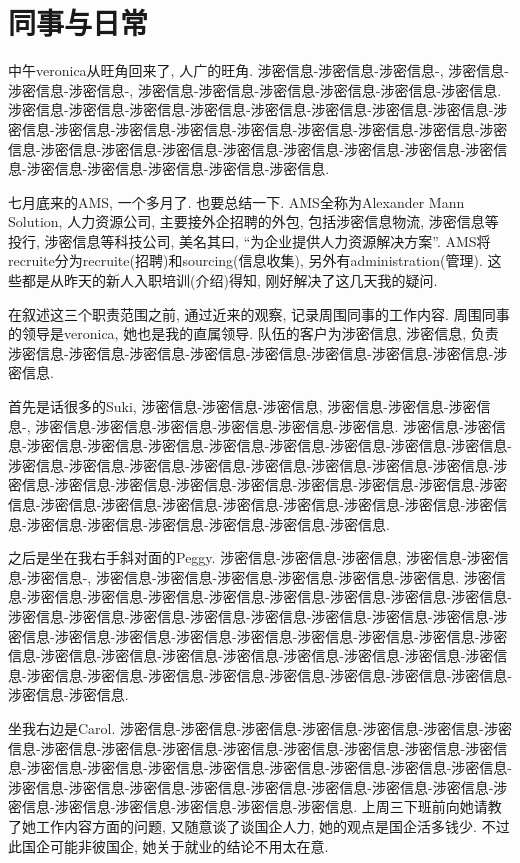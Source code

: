 \section{同事与日常}

中午veronica从旺角回来了, 人广的旺角. 涉密信息-涉密信息-涉密信息-, 涉密信息-涉密信息-涉密信息-, 涉密信息-涉密信息-涉密信息-涉密信息-涉密信息-涉密信息. 涉密信息-涉密信息-涉密信息-涉密信息-涉密信息-涉密信息-涉密信息-涉密信息-涉密信息-涉密信息-涉密信息-涉密信息-涉密信息-涉密信息-涉密信息-涉密信息-涉密信息-涉密信息-涉密信息-涉密信息-涉密信息-涉密信息-涉密信息-涉密信息-涉密信息-涉密信息-涉密信息-涉密信息-涉密信息-涉密信息.

七月底来的AMS, 一个多月了. 也要总结一下. 
AMS全称为Alexander Mann Solution, 人力资源公司, 主要接外企招聘的外包, 包括涉密信息物流, 涉密信息等投行, 涉密信息等科技公司, 美名其曰, “为企业提供人力资源解决方案”. AMS将recruite分为recruite(招聘)和sourcing(信息收集), 另外有administration(管理). 这些都是从昨天的新人入职培训(介绍)得知, 刚好解决了这几天我的疑问.

在叙述这三个职责范围之前, 通过近来的观察, 记录周围同事的工作内容. 周围同事的领导是veronica, 她也是我的直属领导. 队伍的客户为涉密信息, 涉密信息, 负责涉密信息-涉密信息-涉密信息-涉密信息-涉密信息-涉密信息-涉密信息-涉密信息-涉密信息. 

首先是话很多的Suki, 涉密信息-涉密信息-涉密信息, 涉密信息-涉密信息-涉密信息-, 涉密信息-涉密信息-涉密信息-涉密信息-涉密信息-涉密信息. 涉密信息-涉密信息-涉密信息-涉密信息-涉密信息-涉密信息-涉密信息-涉密信息-涉密信息-涉密信息-涉密信息-涉密信息-涉密信息-涉密信息-涉密信息-涉密信息-涉密信息-涉密信息-涉密信息-涉密信息-涉密信息-涉密信息-涉密信息-涉密信息-涉密信息-涉密信息-涉密信息-涉密信息-涉密信息-涉密信息-涉密信息-涉密信息-涉密信息-涉密信息-涉密信息-涉密信息-涉密信息-涉密信息-涉密信息-涉密信息-涉密信息.

之后是坐在我右手斜对面的Peggy. 涉密信息-涉密信息-涉密信息, 涉密信息-涉密信息-涉密信息-, 涉密信息-涉密信息-涉密信息-涉密信息-涉密信息-涉密信息. 涉密信息-涉密信息-涉密信息-涉密信息-涉密信息-涉密信息-涉密信息-涉密信息-涉密信息-涉密信息-涉密信息-涉密信息-涉密信息-涉密信息-涉密信息-涉密信息-涉密信息-涉密信息-涉密信息-涉密信息-涉密信息-涉密信息-涉密信息-涉密信息-涉密信息-涉密信息-涉密信息-涉密信息-涉密信息-涉密信息-涉密信息-涉密信息-涉密信息-涉密信息-涉密信息-涉密信息-涉密信息-涉密信息-涉密信息-涉密信息-涉密信息-涉密信息-涉密信息-涉密信息.

坐我右边是Carol. 涉密信息-涉密信息-涉密信息-涉密信息-涉密信息-涉密信息-涉密信息-涉密信息-涉密信息-涉密信息-涉密信息-涉密信息-涉密信息-涉密信息-涉密信息-涉密信息-涉密信息-涉密信息-涉密信息-涉密信息-涉密信息-涉密信息-涉密信息-涉密信息-涉密信息-涉密信息-涉密信息-涉密信息-涉密信息-涉密信息-涉密信息-涉密信息-涉密信息-涉密信息-涉密信息-涉密信息-涉密信息. 上周三下班前向她请教了她工作内容方面的问题, 又随意谈了谈国企人力, 她的观点是国企活多钱少. 不过此国企可能非彼国企, 她关于就业的结论不用太在意.

